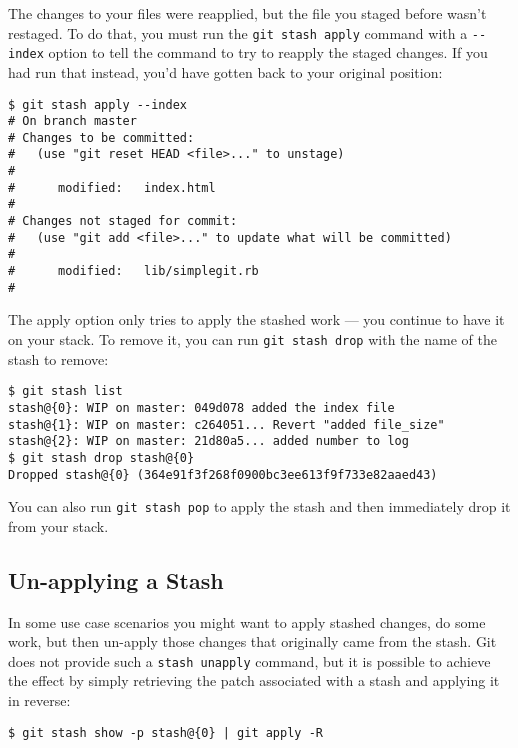 \documentclass[a4paper]{book}
\begin{document}
The changes to your files were reapplied, but the file you staged before wasn't restaged. To do that, you must run the \texttt{git stash apply} command with a \texttt{-{}-index} option to tell the command to try to reapply the staged changes. If you had run that instead, you'd have gotten back to your original position:

\begin{shaded}\begin{verbatim}
$ git stash apply --index
# On branch master
# Changes to be committed:
#   (use "git reset HEAD <file>..." to unstage)
#
#      modified:   index.html
#
# Changes not staged for commit:
#   (use "git add <file>..." to update what will be committed)
#
#      modified:   lib/simplegit.rb
#
\end{verbatim}\end{shaded}

The apply option only tries to apply the stashed work --- you continue to have it on your stack. To remove it, you can run \texttt{git stash drop} with the name of the stash to remove:

\begin{shaded}\begin{verbatim}
$ git stash list
stash@{0}: WIP on master: 049d078 added the index file
stash@{1}: WIP on master: c264051... Revert "added file_size"
stash@{2}: WIP on master: 21d80a5... added number to log
$ git stash drop stash@{0}
Dropped stash@{0} (364e91f3f268f0900bc3ee613f9f733e82aaed43)
\end{verbatim}\end{shaded}

You can also run \texttt{git stash pop} to apply the stash and then immediately drop it from your stack.

\subsection{Un-applying a Stash}

In some use case scenarios you might want to apply stashed changes, do some work, but then un-apply those changes that originally came from the stash. Git does not provide such a \texttt{stash unapply} command, but it is possible to achieve the effect by simply retrieving the patch associated with a stash and applying it in reverse:

\begin{shaded}\begin{verbatim}
$ git stash show -p stash@{0} | git apply -R
\end{verbatim}\end{shaded}
\end{document}

